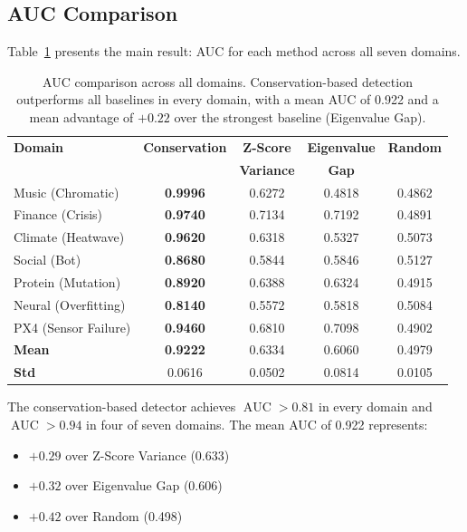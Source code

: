 \documentclass[11pt,a4paper]{article}
\DeclareMathOperator{\AUC}{AUC}
\begin{document}
\subsection{AUC Comparison}

Table~\ref{tab:auc} presents the main result: AUC for each method across all
seven domains.

\begin{table}[ht]
\centering
\caption{AUC comparison across all domains.  Conservation-based detection
outperforms all baselines in every domain, with a mean AUC of 0.922 and a
mean advantage of $+0.22$ over the strongest baseline (Eigenvalue Gap).}
\label{tab:auc}
\begin{tabular}{@{}lcccc@{}}
\toprule
\textbf{Domain} & \textbf{Conservation} & \textbf{Z-Score} & \textbf{Eigenvalue} & \textbf{Random} \\
 & & \textbf{Variance} & \textbf{Gap} & \\
\midrule
Music (Chromatic)      & \textbf{0.9996} & 0.6272 & 0.4818 & 0.4862 \\
Finance (Crisis)       & \textbf{0.9740} & 0.7134 & 0.7192 & 0.4891 \\
Climate (Heatwave)     & \textbf{0.9620} & 0.6318 & 0.5327 & 0.5073 \\
Social (Bot)           & \textbf{0.8680} & 0.5844 & 0.5846 & 0.5127 \\
Protein (Mutation)     & \textbf{0.8920} & 0.6388 & 0.6324 & 0.4915 \\
Neural (Overfitting)   & \textbf{0.8140} & 0.5572 & 0.5818 & 0.5084 \\
PX4 (Sensor Failure)   & \textbf{0.9460} & 0.6810 & 0.7098 & 0.4902 \\
\midrule
\textbf{Mean}          & \textbf{0.9222} & 0.6334 & 0.6060 & 0.4979 \\
\textbf{Std}           & 0.0616          & 0.0502 & 0.0814 & 0.0105 \\
\bottomrule
\end{tabular}
\end{table}

The conservation-based detector achieves $\AUC > 0.81$ in every domain and
$\AUC > 0.94$ in four of seven domains.  The mean AUC of 0.922 represents:
\begin{itemize}
  \item $+0.29$ over Z-Score Variance (0.633)
  \item $+0.32$ over Eigenvalue Gap (0.606)
  \item $+0.42$ over Random (0.498)
\end{itemize}
\end{document}
